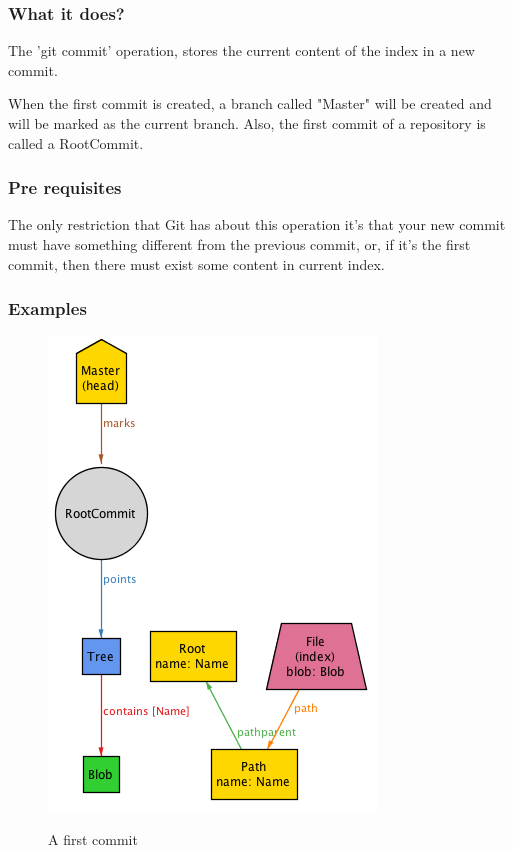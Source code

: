\subsubsection{What it does?}

The 'git commit' operation, stores the current content of the index in a new
commit. \par
When the first commit is created, a branch called "Master" will be created
and will be marked as the current branch. Also, the first commit of a repository
is called a RootCommit. \par

\subsubsection{Pre requisites}

The only restriction that Git has about this operation 
it's that your new commit must have something different from the previous
commit, or, if it's the first commit, then there must exist some content in
current index. \par


\subsubsection{Examples}

\begin{figure} 
	\caption{A first commit}
	\centering
	\includegraphics[scale=0.65]{images/commit1.png}
	\label{fig:commit1}
\end{figure}

